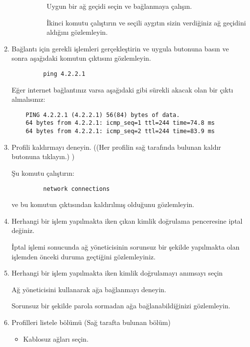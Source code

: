 \documentclass[a4paper,10pt]{article}
\begin{document}
\begin{enumerate}
\begin{enumerate}
\begin{enumerate}
\begin{itemize}
			Uygun bir ağ geçidi seçin ve bağlanmaya çalışın.
		     
		      İkinci komutu çalıştırın ve seçili aygıtın sizin verdiğiniz ağ geçidini aldığını gözlemleyin.
		\end{itemize}
	      \end{enumerate}
	  
	
      \end{enumerate}

	\item Bağlantı için gerekli işlemleri gerçekleştirin ve uygula butonuna basın ve sonra aşağıdaki komutun çıktısını gözlemleyin.
		\begin{verbatim}
		 ping 4.2.2.1
		\end{verbatim}

	Eğer internet bağlantınız varsa aşağıdaki gibi sürekli akacak olan bir çıktı almalısınız:
	\begin{verbatim}
	PING 4.2.2.1 (4.2.2.1) 56(84) bytes of data.
	64 bytes from 4.2.2.1: icmp_seq=1 ttl=244 time=74.8 ms
	64 bytes from 4.2.2.1: icmp_seq=2 ttl=244 time=83.9 ms
      	\end{verbatim}

      \item Profili kaldırmayı deneyin. ((Her profilin sağ tarafında bulunan kaldır butonuna tıklayın.) )
      
	    Şu komutu çalıştırın:
	    \begin{verbatim}
	     network connections
	    \end{verbatim}
	    ve bu komutun çıktısından kaldırılmış olduğunu gözlemleyin.

	\item Herhangi bir işlem yapılmakta iken çıkan kimlik doğrulama penceresine iptal değiniz.

	İptal işlemi sonucunda ağ yöneticisinin sorunsuz bir şekilde yapılmakta olan işlemden önceki duruma geçtiğini gözlemleyiniz.

	\item Herhangi bir işlem yapılmakta iken kimlik doğrulamayı anımsayı seçin 
	
	Ağ yöneticisini kullanarak ağa bağlanmayı deneyin.
	
	Sorunsuz bir şekilde parola sormadan ağa bağlanabildiğinizi gözlemleyin.
	\item Profilleri listele bölümü (Sağ tarafta bulunan bölüm)
	\begin{itemize}
	 \item Kablosuz ağları seçin.
	

\end{itemize}
\end{enumerate}
\end{document}
